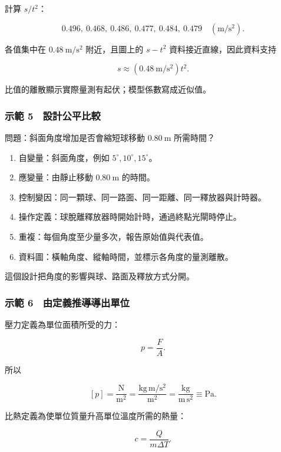 \documentclass[11pt,a4paper]{article}
\providecommand{\tightlist}{%
  \setlength{\itemsep}{0pt}\setlength{\parskip}{0pt}}
\begin{document}
計算 \(s/t^2\)：

\[
0.496,\ 0.468,\ 0.486,\ 0.477,\ 0.484,\ 0.479
\quad(\mathrm{m/s^2}).
\]

各值集中在 \(0.48\ \mathrm{m/s^2}\) 附近，且圖上的 \(s-t^2\) 資料接近直線，因此資料支持

\[
s\approx(0.48\ \mathrm{m/s^2})t^2.
\]

比值的離散顯示實際量測有起伏；模型係數寫成近似值。

\subsubsection{示範 5　設計公平比較}\label{ux793aux7bc4-5-ux8a2dux8a08ux516cux5e73ux6bd4ux8f03}

問題：斜面角度增加是否會縮短球移動 \(0.80\ \mathrm m\) 所需時間？

\begin{enumerate}
\def\labelenumi{\arabic{enumi}.}
\tightlist
\item
  自變量：斜面角度，例如 \(5^\circ,10^\circ,15^\circ\)。
\item
  應變量：由靜止移動 \(0.80\ \mathrm m\) 的時間。
\item
  控制變因：同一顆球、同一路面、同一距離、同一釋放器與計時器。
\item
  操作定義：球脫離釋放器時開始計時，通過終點光閘時停止。
\item
  重複：每個角度至少量多次，報告原始值與代表值。
\item
  資料圖：橫軸角度、縱軸時間，並標示各角度的量測離散。
\end{enumerate}

這個設計把角度的影響與球、路面及釋放方式分開。

\subsubsection{示範 6　由定義推導導出單位}\label{ux793aux7bc4-6-ux7531ux5b9aux7fa9ux63a8ux5c0eux5c0eux51faux55aeux4f4d}

壓力定義為單位面積所受的力：

\[
p=\frac FA.
\]

所以

\[
[p]=\frac{\mathrm N}{\mathrm{m^2}}
=\frac{\mathrm{kg\,m/s^2}}{\mathrm{m^2}}
=\frac{\mathrm{kg}}{\mathrm{m\,s^2}}
\equiv\mathrm{Pa}.
\]

比熱定義為使單位質量升高單位溫度所需的熱量：

\[
c=\frac{Q}{m\Delta T}.
\]
\end{document}
